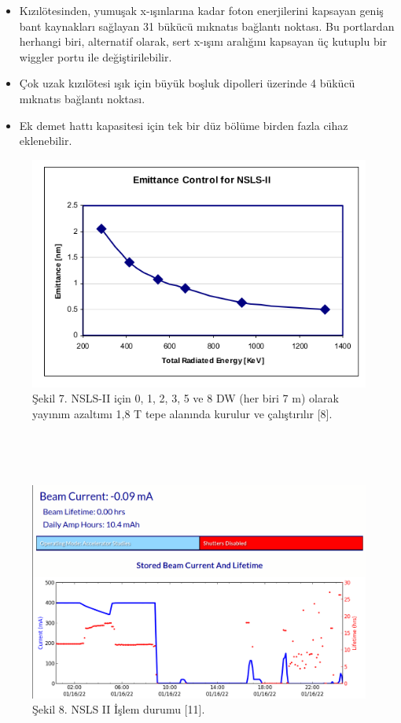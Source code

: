 \documentclass{article}
\begin{document}
\begin{itemize}
    \item Kızılötesinden, yumuşak x-ışınlarına kadar foton enerjilerini kapsayan geniş bant kaynakları sağlayan 31 bükücü mıknatıs bağlantı noktası. Bu portlardan herhangi biri, alternatif olarak, sert x-ışını aralığını kapsayan üç kutuplu bir wiggler portu ile değiştirilebilir.
    
    \item Çok uzak kızılötesi ışık için büyük boşluk dipolleri üzerinde 4 bükücü mıknatıs bağlantı noktası.
    
    \item Ek demet hattı kapasitesi için tek bir düz bölüme birden fazla cihaz eklenebilir.
\end{itemize}


\newpage

	\begin{figure}[h]
 \centering
\includegraphics[width=13cm]{emittence.png}
\caption*{
\centering
Şekil 7. NSLS-II için 0, 1, 2, 3, 5 ve 8 DW (her biri 7 m) olarak yayınım azaltımı 1,8 T tepe alanında kurulur ve çalıştırılır [8].}
	\end{figure}
	
	\  
	
	\ 
	
		\begin{figure}[h]
 \centering
\includegraphics[width=13cm]{status.png}
\caption*{Şekil 8. NSLS II İşlem durumu [11].}
	\end{figure} 
	
\end{document}

